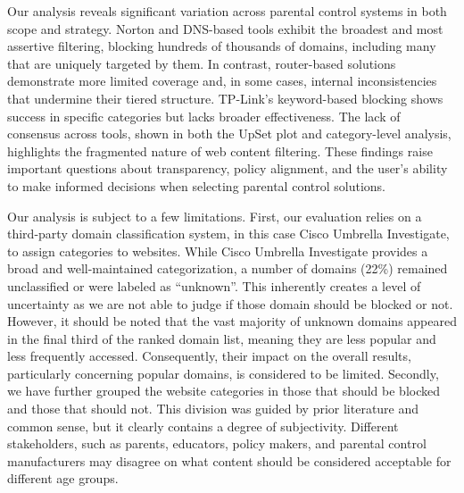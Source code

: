 Our analysis reveals significant variation across parental control systems in both scope and strategy. 
Norton and DNS-based tools exhibit the broadest and most assertive filtering, blocking hundreds of thousands of domains, including many that are uniquely targeted by them.
In contrast, router-based solutions demonstrate more limited coverage and, in some cases, internal inconsistencies that undermine their tiered structure.
TP-Link’s keyword-based blocking shows success in specific categories but lacks broader effectiveness. 
The lack of consensus across tools, shown in both the UpSet plot and category-level analysis, highlights the fragmented nature of web content filtering.
These findings raise important questions about transparency, policy alignment, and the user’s ability to make informed decisions when selecting parental control solutions.

Our analysis is subject to a few limitations. 
First, our evaluation relies on a third-party domain classification system, in this case Cisco Umbrella Investigate, to assign categories to websites. 
While Cisco Umbrella Investigate provides a broad and well-maintained categorization, a number of domains (22\%) remained unclassified or were labeled as ``unknown''. This inherently creates a level of uncertainty as we are not able to judge if those domain should be blocked or not. 
However, it should be noted that the vast majority of unknown domains appeared in the final third of the ranked domain list, meaning they are less popular and less frequently accessed. Consequently, their impact on the overall results, particularly concerning popular domains, is considered to be limited.
%
Secondly, we have further grouped the website categories in those that should be blocked and those that should not.
This division was guided by prior literature and common sense, but it clearly contains a degree of subjectivity. 
Different stakeholders, such as parents, educators, policy makers, and parental control manufacturers may disagree on what content should be considered acceptable for different age groups.
%


